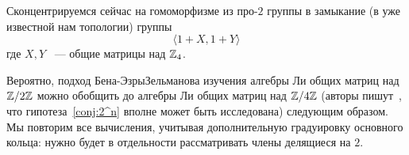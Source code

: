 Сконцентрируемся сейчас на гомоморфизме из про-$2$ группы в замыкание (в уже известной нам топологии) группы
\[\langle 1+X, 1+Y \rangle\]
где $X,Y$ ~--- общие матрицы над $\mathbb{Z}_4$.

Вероятно, подход Бена-Эзры\textemdash Зельманова изучения алгебры Ли общих матриц над $\mathbb{Z}/2\mathbb{Z}$ можно обобщить до алгебры Ли общих матриц над $\mathbb{Z}/4\mathbb{Z}$ (авторы пишут~\cite{Ben-Ezra-Zelmanov}, что гипотеза~\ref{conj:2^n} вполне может быть исследована) следующим образом.
Мы повторим все вычисления, учитывая дополнительную градуировку основного кольца: нужно будет в отдельности рассматривать члены делящиеся на $2$.

